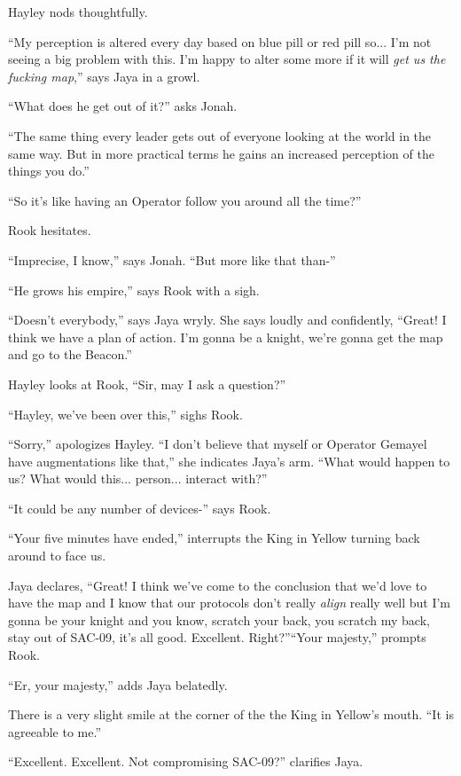 Hayley nods thoughtfully.

``My perception is altered every day based on blue pill or red pill so... I'm not seeing a big problem with this.   I'm happy to alter some more if it will \textit{get us the fucking map},'' says Jaya in a growl.

``What does he get out of it?'' asks Jonah.

``The same thing every leader gets out of everyone looking at the world in the same way.  But in more practical terms he gains an increased perception of the things you do.''

``So it's like having an Operator follow you around all the time?''

Rook hesitates.

``Imprecise, I know,'' says Jonah.  ``But more like that than-''

``He grows his empire,'' says Rook with a sigh.

``Doesn't everybody,'' says Jaya wryly.  She says loudly and confidently, ``Great!  I think we have a plan of action.  I'm gonna be a knight, we're gonna get the map and go to the Beacon.'' 



Hayley looks at Rook, ``Sir, may I ask a question?''

``Hayley, we've been over this,'' sighs Rook.

``Sorry,'' apologizes Hayley.  ``I don't believe that myself or Operator Gemayel have augmentations like that,'' she indicates Jaya's arm.  ``What would happen to us?  What would this... person... interact with?''

``It could be any number of devices-'' says Rook.



``Your five minutes have ended,'' interrupts the King in Yellow turning back around to face us.

Jaya declares, ``Great!  I think we've come to the conclusion that we'd love to have the map and I know that our protocols don't really \textit{align} really well but I'm gonna be your knight and you know, scratch your back, you scratch my back, stay out of SAC-09, it's all good.  Excellent. Right?''``Your majesty,'' prompts Rook.

``Er, your majesty,'' adds Jaya belatedly.

There is a very slight smile at the corner of the the King in Yellow's mouth.  ``It is agreeable to me.''

``Excellent.  Excellent.  Not compromising SAC-09?'' clarifies Jaya.

